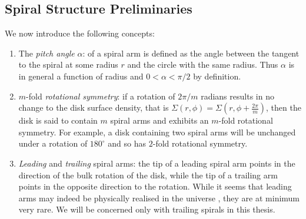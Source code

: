 \subsection{Spiral Structure Preliminaries}
We now introduce the following concepts:
\begin{enumerate}
    \item The \textit{pitch angle} $\alpha$: of a spiral arm is defined as the angle between the tangent to the spiral at some radius $r$ and the circle with the same radius. 
    Thus $\alpha$ is in general a function of radius and $0 < \alpha < \pi/2$ by definition.
    \item $m$-fold \textit{rotational symmetry}: if a rotation of $2\pi/m$ radians results in no change to the disk surface density, that is $\Sigma(r,\phi)=\Sigma(r,\phi+\frac{2\pi}{m})$, then the disk is said to contain $m$ spiral arms and exhibits an $m$-fold rotational symmetry. 
    For example, a disk containing two spiral arms will be unchanged under a rotation of $180^\circ$ and so has $2$-fold rotational symmetry.
    \item \textit{Leading} and \textit{trailing} spiral arms: the tip of a leading spiral arm points in the direction of the bulk rotation of the disk, while the tip of a trailing arm points in the opposite direction to the rotation. 
    While it seems that leading arms may indeed be physically realised in the universe \citep[e.g.][]{vaisanen2008}, they are at minimum very rare. 
    We will be concerned only with trailing spirals in this thesis.
\end{enumerate}

